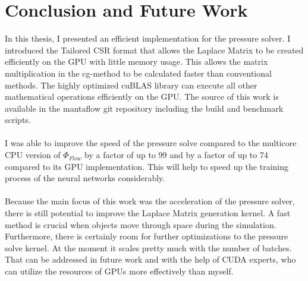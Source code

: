 \chapter{Conclusion and Future Work}\label{chapter:conclusion}

In this thesis, I presented an efficient implementation for the pressure solver. I introduced the Tailored CSR format that allows the Laplace Matrix to be created efficiently on the GPU with little memory usage. This allows the matrix multiplication in the cg-method to be calculated faster than conventional methods. The highly optimized cuBLAS library can execute all other mathematical operations efficiently on the GPU. The source of this work is available in the mantaflow git repository including the build and benchmark scripts.\\\\
I was able to improve the speed of the pressure solve compared to the multicore CPU version of $\Phi_{Flow}$ by a factor of up to 99 and by a factor of up to 74 compared to its GPU implementation. This will help to speed up the training process of the neural networks considerably. \\\\
Because the main focus of this work was the acceleration of the pressure solver, there is still potential to improve the Laplace Matrix generation kernel. A fast method is crucial when objects move through space during the simulation. Furthermore, there is certainly room for further optimizations to the pressure solve kernel. At the moment it scales pretty much with the number of batches. That can be addressed in future work and with the help of CUDA experts, who can utilize the resources of GPUs more effectively than myself. 